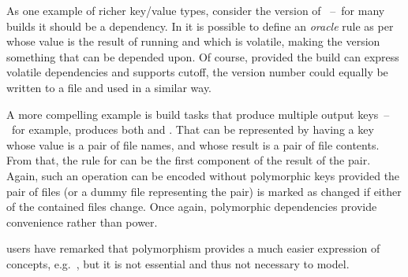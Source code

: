 As one example of richer key/value types, consider the version of
~--~for many builds it should be a dependency. In \Shake it is possible
to define an \emph{oracle} rule as per~\cite{mitchell2012shake} whose value is
the result of running  and which is volatile, making the
 version something that can be depended upon. Of course, provided the
build can express volatile dependencies and supports cutoff, the version number
could equally be written to a file and used in a similar way.

A more compelling example is build tasks that produce multiple output
keys~--~for example,  produces both  and .
That can be represented by having a key whose value is a pair of file names, and
whose result is a pair of file contents. From that, the rule for 
can be the first component of the result of the pair. Again, such an operation
can be encoded without polymorphic keys provided the pair of files (or a dummy
file representing the pair) is marked as changed if either of the contained
files change. Once again, polymorphic dependencies provide convenience rather
than power.

\Shake users have remarked that polymorphism provides a much easier expression
of concepts, e.g.~\cite{hadrian}, but it is not essential and thus not necessary
to model.
